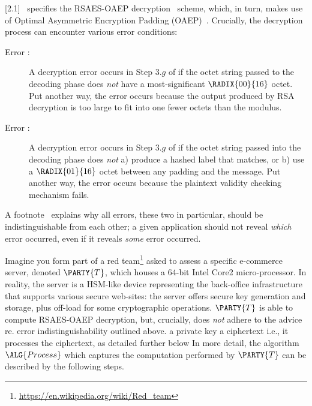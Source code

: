 %



[2.1]~\cite{SCALE:RFC:3447}
specifies the
RSAES-OAEP decryption~\cite[Section 7.1]{SCALE:RFC:3447}
scheme, which, in turn, makes use of 
Optimal Asymmetric Encryption Padding (OAEP)~\cite{SCALE:BelRog:94}.  
Crucially, the decryption process can encounter various error conditions:

\begin{description}
\item[Error :]
     A decryption error occurs in Step $3.g$ of  
     if the octet string passed to the decoding phase
     does {\em not} have a most-significant $\RADIX{00}{16}$ octet.
     Put another way, the error occurs because 
     the output produced by RSA decryption is too large to fit into one 
     fewer octets than the modulus.
\item[Error :]
     A decryption error occurs in Step $3.g$ of  
     if the octet string passed into the decoding phase 
     does {\em not} a) produce a hashed label that matches, or b) use a
     $\RADIX{01}{16}$ octet between any padding and the message.
     Put another way, the error occurs because 
     the plaintext validity checking mechanism fails.
\end{description}

\noindent
A footnote~\cite[Section 7.1.2]{SCALE:RFC:3447} explains why all errors, 
these two in particular, should be indistinguishable from each other; a
given application should not reveal {\em which} error occurred, even if
it reveals {\em some} error occurred.  

Imagine you form part of a red team\footnote{
\url{https://en.wikipedia.org/wiki/Red_team}
} asked to assess a specific e-commerce server, denoted 
$\PARTY{T}$, 
which houses a $64$-bit Intel Core2 micro-processor.  
In reality, the server is a HSM-like device representing the back-office 
infrastructure that supports various secure web-sites: the server offers
secure key generation and storage, plus off-load for some cryptographic 
operations.  
$\PARTY{T}$ 
is able to compute RSAES-OAEP decryption, but, crucially, does {\em not} 
adhere to the advice re. error indistinguishability outlined above.
\DESCINTRO[leak]
{}
{a private key}
{a ciphertext}
{i.e., it processes the ciphertext, as detailed further below}
{}
In more detail, the algorithm
$\ALG{Process}$
which captures the computation performed by
$\PARTY{T}$
can be described by the following steps.

